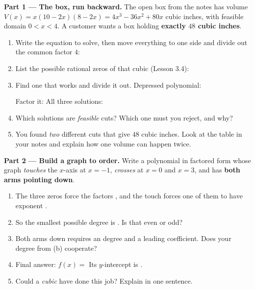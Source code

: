 \documentclass[10pt]{article}
\begin{document}
\begin{tcolorbox}[colback=white, colframe=black!40, title=\textbf{Tier E --- Extension},
    fonttitle=\bfseries, arc=1.5mm, left=3mm, right=3mm, top=2mm, bottom=2mm, breakable]
\textbf{Part 1 --- The box, run backward.} The open box from the notes has volume
$V(x) = x(10-2x)(8-2x) = 4x^3 - 36x^2 + 80x$ cubic inches, with feasible domain $0 < x < 4$. A
customer wants a box holding \textbf{exactly $48$ cubic inches}.
\begin{enumerate}[label=(\alph*), leftmargin=1.8em, itemsep=6pt]
  \item Write the equation to solve, then move everything to one side and divide out the common
        factor $4$: \; \blank{5.4cm}
  \item List the possible rational zeros of that cubic (Lesson 3.4): \blank{6.0cm}
  \item Find one that works and divide it out. Depressed polynomial: \blank{3.0cm}

        \vspace{2pt}
        Factor it: \blank{3.0cm} \; All three solutions: \blank{3.4cm}
  \item Which solutions are \emph{feasible} cuts? \blank{2.6cm} \; Which one must you reject, and
        why? \blank{4.4cm}
  \item You found \emph{two} different cuts that give $48$ cubic inches. Look at the table in your
        notes and explain how one volume can happen twice. \writeline
\end{enumerate}

\vspace{5pt}
\textbf{Part 2 --- Build a graph to order.} Write a polynomial in factored form whose graph
\emph{touches} the $x$-axis at $x=-1$, \emph{crosses} at $x=0$ and $x=3$, and has \textbf{both arms
pointing down}.
\begin{enumerate}[label=(\alph*), leftmargin=1.8em, itemsep=6pt]
  \item The three zeros force the factors \blank{4.0cm}, and the touch forces one of them to have
        exponent \blank{1.0cm}.
  \item So the smallest possible degree is \blank{1.0cm}. Is that even or odd? \blank{1.4cm}
  \item Both arms down requires an \blank{1.6cm} degree and a \blank{1.8cm} leading coefficient.
        Does your degree from (b) cooperate? \blank{1.2cm}
  \item Final answer: $f(x) = $ \blank{5.0cm} \quad Its $y$-intercept is \blank{1.4cm}.
  \item Could a \emph{cubic} have done this job? \blank{1.2cm} \; Explain in one sentence.
        \writeline
\end{enumerate}


\end{tcolorbox}
\end{document}
